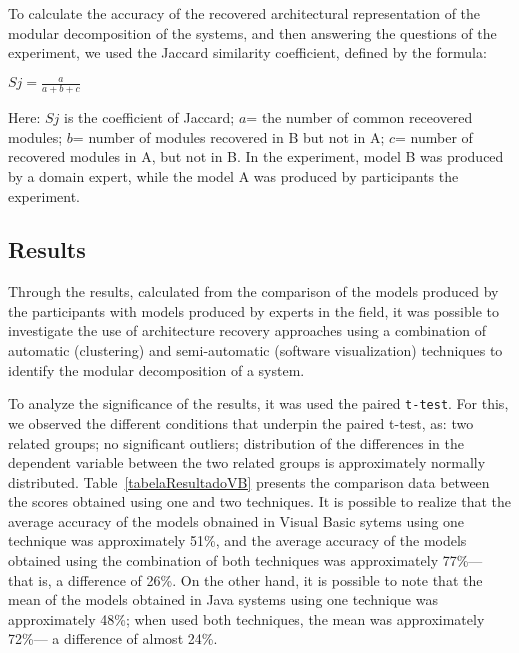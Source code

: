 {To calculate the accuracy of the recovered architectural representation of the modular decomposition of the systems, and then answering the questions of the experiment, we used the Jaccard similarity coefficient, defined by the formula:

\begin{center}
	$Sj= \frac{a}{a+b+c}$
\end{center}

Here: $Sj$ is the coefficient of Jaccard; $a$= the number of common receovered 
modules; $b$= number of modules recovered in B but not in A; $c$= number of recovered 
modules in A, but not in B. In the experiment, model B was produced by a domain expert, while the model 
A was produced by participants  the experiment.


\subsection{Results}%

Through the results, calculated from the comparison of the models produced by the participants with models produced by experts in the field, 
it was possible to investigate the use of architecture recovery approaches using a combination of automatic (clustering) and semi-automatic (software visualization) 
techniques to identify the modular decomposition of a system.  

To analyze the significance of the results, it was used the paired \texttt{t-test}. For this, we observed the different conditions that underpin the paired t-test, as: two related groups; no significant outliers; distribution of the differences in the dependent variable between the two related groups is approximately normally distributed. Table~\ref{tabelaResultadoVB} presents the comparison data between the scores obtained using one and two techniques. It is possible to realize that the average accuracy of the models obnained in Visual Basic sytems using one technique 
was approximately 51\%, and the average accuracy of the models obtained using the combination of both techniques was approximately 77\%--- that is, a difference of 26\%. 
On the other hand, it is possible to note that the mean of the models obtained in Java systems using one technique was approximately 48\%; when used both techniques, 
the mean was approximately 72\%--- a difference of almost 24\%.

}
